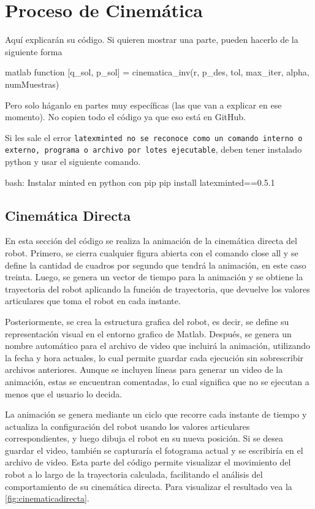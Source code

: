 \section{Proceso de Cinemática} \label{sec:proceso_cinematica}

Aquí explicarán su código. Si quieren mostrar una parte, pueden hacerlo de la siguiente forma

\begin{matlabcode}{matlab}
	function [q_sol, p_sol] = cinematica_inv(r, p_des, tol, max_iter, alpha, numMuestras)
\end{matlabcode}

Pero solo háganlo en partes muy específicas (las que van a explicar en ese momento). No copien todo el código ya que eso está en GitHub.

Si les sale el error \texttt{latexminted no se reconoce como un comando interno o externo, programa o archivo por lotes ejecutable}, deben tener instalado python y usar el siguiente comando.
\begin{terminal}{bash: Instalar minted en python con pip}
	pip install latexminted==0.5.1
\end{terminal}

\subsection{Cinemática Directa}

En esta sección del código se realiza la animación de la cinemática directa del robot. Primero, se cierra cualquier figura abierta con el comando close all y se define la cantidad de cuadros por segundo que tendrá la animación, en este caso treinta. Luego, se genera un vector de tiempo para la animación y se obtiene la trayectoria del robot aplicando la función de trayectoria, que devuelve los valores articulares que toma el robot en cada instante. 

Posteriormente, se crea la estructura grafica del robot, es decir, se define su representación visual en el entorno grafico de Matlab. Después, se genera un nombre automático para el archivo de video que incluirá la animación, utilizando la fecha y hora actuales, lo cual permite guardar cada ejecución sin sobrescribir archivos anteriores. Aunque se incluyen líneas para generar un video de la animación, estas se encuentran comentadas, lo cual significa que no se ejecutan a menos que el usuario lo decida. 

La animación se genera mediante un ciclo que recorre cada instante de tiempo y actualiza la configuración del robot usando los valores articulares correspondientes, y luego dibuja el robot en su nueva posición. Si se desea guardar el video, también se capturaría el fotograma actual y se escribiría en el archivo de video. Esta parte del código permite visualizar el movimiento del robot a lo largo de la trayectoria calculada, facilitando el análisis del comportamiento de su cinemática directa. Para visualizar el resultado vea la \autoref{fig:cinematicadirecta}.

